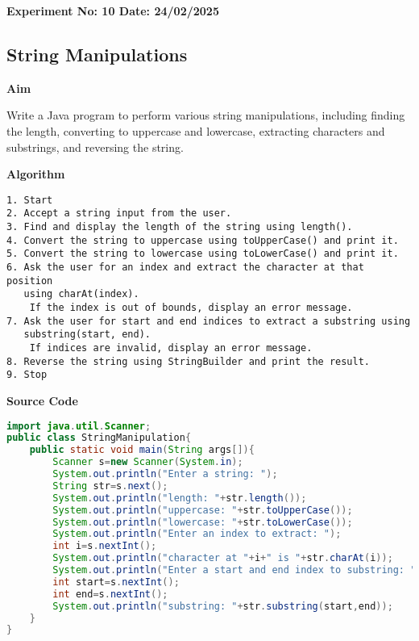 \textbf{Experiment No: 10 \hfill Date: 24/02/2025}

\begin{center}
    \Large \subsection*{String Manipulations}
\end{center}

\textbf{Aim}
\vspace{0.5cm}

Write a Java program to perform various string manipulations, including finding the length, converting to uppercase and lowercase, extracting characters and substrings, and reversing the string.


\vspace{0.5cm}
\textbf{Algorithm}
\vspace{0.5cm}
\begin{verbatim}
1. Start
2. Accept a string input from the user.
3. Find and display the length of the string using length().
4. Convert the string to uppercase using toUpperCase() and print it.
5. Convert the string to lowercase using toLowerCase() and print it.
6. Ask the user for an index and extract the character at that position 
   using charAt(index).
    If the index is out of bounds, display an error message.
7. Ask the user for start and end indices to extract a substring using 
   substring(start, end).
    If indices are invalid, display an error message.
8. Reverse the string using StringBuilder and print the result.
9. Stop
\end{verbatim}

\vspace{0.5cm}
\textbf{Source Code}
\begin{lstlisting}[language=Java]
import java.util.Scanner;
public class StringManipulation{
	public static void main(String args[]){
		Scanner s=new Scanner(System.in);
		System.out.println("Enter a string: ");
		String str=s.next();
		System.out.println("length: "+str.length());
		System.out.println("uppercase: "+str.toUpperCase());
		System.out.println("lowercase: "+str.toLowerCase());
		System.out.println("Enter an index to extract: ");
		int i=s.nextInt();
		System.out.println("character at "+i+" is "+str.charAt(i));
		System.out.println("Enter a start and end index to substring: ");
		int start=s.nextInt();
		int end=s.nextInt();
		System.out.println("substring: "+str.substring(start,end));
	}
}
\end{lstlisting}

